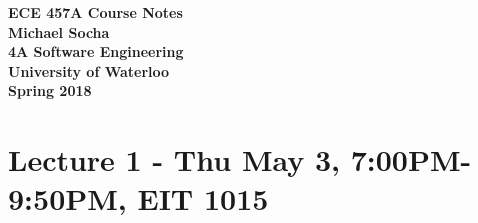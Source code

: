 \documentclass[12pt,titlepage]{article}
\begin{document}
  \begin{titlepage}
    \vspace*{\fill}
    \centering

    \textbf{\Huge ECE 457A Course Notes} \\ [1em]
    \textbf{\Large Michael Socha} \\ [1em]
    \textbf{\large 4A Software Engineering} \\
    \textbf{\large University of Waterloo} \\
    \textbf{\large Spring 2018} \\
    \vspace*{\fill}
  \end{titlepage}

  \newpage 

  \section*{Lecture 1 - Thu May 3, 7:00PM-9:50PM, EIT 1015}
\end{document}

